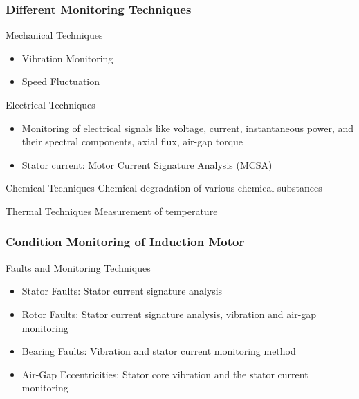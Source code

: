\documentclass[9pt]{beamer}
\begin{document}
\begin{frame}
\frametitle{Different Monitoring Techniques}
    \begin{block}{Mechanical Techniques}  
    \begin{itemize}
    \item Vibration Monitoring
    \item Speed Fluctuation
   \end{itemize} 
    \end{block}
    \begin{block}{Electrical Techniques} 
    \begin{itemize}
    \item Monitoring of electrical signals like voltage, current, instantaneous power, and their spectral components, axial flux, air-gap torque
    \item Stator current: \alert{Motor Current Signature Analysis (MCSA)}
    \end{itemize}
    \end{block}
    \begin{block}{Chemical Techniques} 
    Chemical degradation of various chemical substances
    \end{block}
    \begin{block}{Thermal Techniques} 
    Measurement of temperature
    \end{block}
\end{frame}

\begin{frame}
\frametitle{Condition Monitoring of Induction Motor}

\begin{block}{Faults and Monitoring Techniques}
    \begin{itemize}
    \item \alert{Stator Faults}: Stator current signature analysis
    \item \alert{Rotor Faults}: Stator current signature analysis, vibration and air-gap monitoring
    \item \alert{Bearing Faults}: Vibration and stator current monitoring method
    \item \alert{Air-Gap  Eccentricities}: Stator core vibration and the stator current monitoring
    \end{itemize}
\end{block}
\end{frame}
\end{document}
